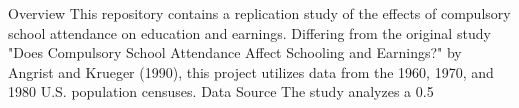 Overview This repository contains a replication study of the effects of compulsory school attendance on education and earnings. Differing from the original study "Does Compulsory School Attendance Affect Schooling and Earnings?" by Angrist and Krueger (1990), this project utilizes data from the 1960, 1970, and 1980 U.S. population censuses. Data Source The study analyzes a 0.5%
